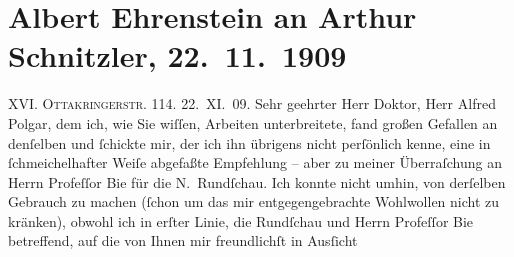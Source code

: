 

         
         \renewcommand{\erwaehntePersonen}{Personen: Oskar Bie, Samuel Fischer, Alfred Polgar}
         \renewcommand{\erwaehnteOrte}{Orte: Berlin, Ottakringerstraße, Wien}
         \renewcommand{\erwaehnteWerke}{Werke: Die alte Geschichte, Die neue Rundschau, Mitgefühl, Saccumum, Tai-Gin, Tod des Zehir eddin Muhammed Baber, Tubutsch}
               \section[Albert Ehrenstein an Arthur Schnitzler, 22. 11. 1909]{ Albert Ehrenstein an Arthur Schnitzler, 22. 11. 1909}\nopagebreak{}\rehead{ }\begin{ledgroupsized}[t]{13cm}\normalsize\beginnumbering \toendnotes[C]{\smallbreak\pagebreak[2]} 
\toendnotes[C]{\smallbreak}\pstart
           \noindent{}{\pb}XVI. \textsc{Ottakringerstr.}
                        114. \hfill 22. XI. 09. \pend
           \pstart{}Sehr geehrter Herr Doktor,\pend\pstart
           Herr Alfred Polgar, dem ich, wie Sie wiſſen,
               Arbeiten unterbreitete, fand großen Gefallen an denſelben und ſchickte mir, der ich
               ihn übrigens nicht perſönlich kenne, eine in ſchmeichelhafter Weiſe abgefaßte
               Empfehlung – aber zu meiner Überraſchung an Herrn Profeſſor Bie für die N. Rundſchau.
               Ich konnte nicht umhin, von derſelben Gebrauch zu machen (ſchon um das mir
               entgegengebrachte Wohlwollen nicht zu kränken), obwohl ich in erſter Linie, die Rundſchau und Herrn Profeſſor Bie betreffend, auf die {\pb}von Ihnen mir freundlichſt in Ausſicht

\end{ledgroupsized}
